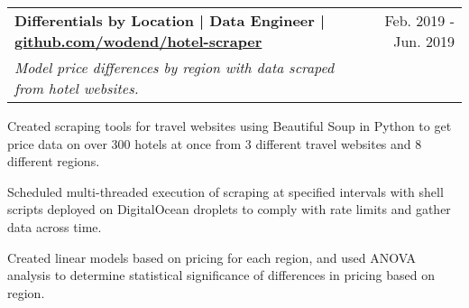 \documentclass{article}
\makeatletter
\newcommand{\beginResumeList}{\begin{itemize}\setlength\itemsep{0em}\begin{minipage}{0.9\textwidth}}
\newcommand{\resumeListEnd}{\end{minipage}\end{itemize}}
\newcommand{\normalItem}[1]{\normalsize\item{#1}}
\newcommand{\education}[3]{
  \begin{tabular*}{\textwidth}[t]{l@{\extracolsep{\fill}}r}
    \normalsize\textbf{#1, }\textit{#2} & \normalsize #3 \\
  \end{tabular*}\vspace{-10pt}
}
\newcommand{\project}[3]{
  \begin{tabular*}{\textwidth}[t]{l@{\extracolsep{\fill}}r}
    \normalsize\textbf{#1} & \normalsize{#2} \\
    \normalsize\textit{#3}
  \end{tabular*}
}
\makeatother
\begin{document}
  \project
    {Differentials by Location | Data Engineer | \href{https://github.com/wodend/hotel-scraper}{github.com/wodend/hotel-scraper}}
    {Feb. 2019 - Jun. 2019}
    {Model price differences by region with data scraped from hotel websites.}
    \beginResumeList
      \normalItem{Created scraping tools for travel websites using Beautiful Soup in Python to get price data on over 300 hotels at once from 3 different travel websites and 8 different regions.}
      \normalItem{Scheduled multi-threaded execution of scraping at specified intervals with shell scripts deployed on DigitalOcean droplets to comply with rate limits and gather data across time.}
      \normalItem{Created linear models based on pricing for each region, and used ANOVA analysis to determine statistical significance of differences in pricing based on region.}
    \resumeListEnd

\end{document}
